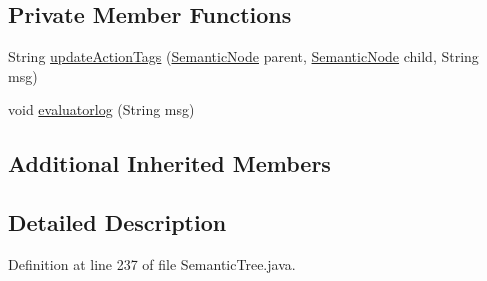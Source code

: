 \subsection*{Private Member Functions}
\begin{DoxyCompactItemize}
\item 
String \hyperlink{classit_1_1emarolab_1_1cagg_1_1core_1_1evaluation_1_1semanticGrammar_1_1SemanticTree_1_1Semantic4c3f840cd671383fb305cb0305b7229f_a925de4266d9555cdb2af1291ae670e8a}{update\-Action\-Tags} (\hyperlink{classit_1_1emarolab_1_1cagg_1_1core_1_1evaluation_1_1semanticGrammar_1_1SemanticTree_1_1SemanticNode}{Semantic\-Node} parent, \hyperlink{classit_1_1emarolab_1_1cagg_1_1core_1_1evaluation_1_1semanticGrammar_1_1SemanticTree_1_1SemanticNode}{Semantic\-Node} child, String msg)
\item 
void \hyperlink{classit_1_1emarolab_1_1cagg_1_1core_1_1evaluation_1_1semanticGrammar_1_1SemanticTree_1_1Semantic4c3f840cd671383fb305cb0305b7229f_aefb456d662462cecf2fdfcb598e84ef5}{evaluatorlog} (String msg)
\end{DoxyCompactItemize}
\subsection*{Additional Inherited Members}


\subsection{Detailed Description}


Definition at line 237 of file Semantic\-Tree.\-java.



